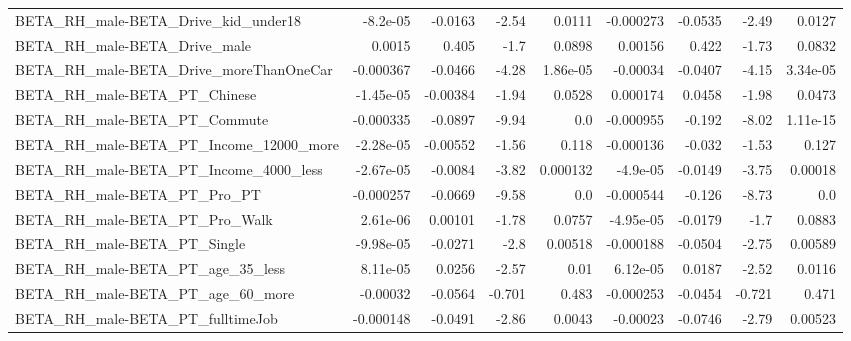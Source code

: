 \begin{tabular}{lrrrrrrrr}
BETA\_RH\_male-BETA\_Drive\_kid\_under18                &    -8.2e-05 &      -0.0163 &     -2.54 &   0.0111 &  -0.000273 &     -0.0535 &        -2.49 &        0.0127 \\
BETA\_RH\_male-BETA\_Drive\_male                       &      0.0015 &        0.405 &      -1.7 &   0.0898 &    0.00156 &       0.422 &        -1.73 &        0.0832 \\
BETA\_RH\_male-BETA\_Drive\_moreThanOneCar             &   -0.000367 &      -0.0466 &     -4.28 & 1.86e-05 &   -0.00034 &     -0.0407 &        -4.15 &      3.34e-05 \\
BETA\_RH\_male-BETA\_PT\_Chinese                       &   -1.45e-05 &     -0.00384 &     -1.94 &   0.0528 &   0.000174 &      0.0458 &        -1.98 &        0.0473 \\
BETA\_RH\_male-BETA\_PT\_Commute                       &   -0.000335 &      -0.0897 &     -9.94 &      0.0 &  -0.000955 &      -0.192 &        -8.02 &      1.11e-15 \\
BETA\_RH\_male-BETA\_PT\_Income\_12000\_more             &   -2.28e-05 &     -0.00552 &     -1.56 &    0.118 &  -0.000136 &      -0.032 &        -1.53 &         0.127 \\
BETA\_RH\_male-BETA\_PT\_Income\_4000\_less              &   -2.67e-05 &      -0.0084 &     -3.82 & 0.000132 &   -4.9e-05 &     -0.0149 &        -3.75 &       0.00018 \\
BETA\_RH\_male-BETA\_PT\_Pro\_PT                        &   -0.000257 &      -0.0669 &     -9.58 &      0.0 &  -0.000544 &      -0.126 &        -8.73 &           0.0 \\
BETA\_RH\_male-BETA\_PT\_Pro\_Walk                      &    2.61e-06 &      0.00101 &     -1.78 &   0.0757 &  -4.95e-05 &     -0.0179 &         -1.7 &        0.0883 \\
BETA\_RH\_male-BETA\_PT\_Single                        &   -9.98e-05 &      -0.0271 &      -2.8 &  0.00518 &  -0.000188 &     -0.0504 &        -2.75 &       0.00589 \\
BETA\_RH\_male-BETA\_PT\_age\_35\_less                   &    8.11e-05 &       0.0256 &     -2.57 &     0.01 &   6.12e-05 &      0.0187 &        -2.52 &        0.0116 \\
BETA\_RH\_male-BETA\_PT\_age\_60\_more                   &    -0.00032 &      -0.0564 &    -0.701 &    0.483 &  -0.000253 &     -0.0454 &       -0.721 &         0.471 \\
BETA\_RH\_male-BETA\_PT\_fulltimeJob                   &   -0.000148 &      -0.0491 &     -2.86 &   0.0043 &   -0.00023 &     -0.0746 &        -2.79 &       0.00523 \\

\end{tabular}
